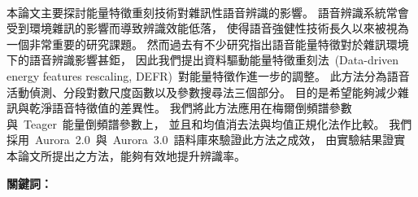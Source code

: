 \renewcommand{\thesisabstracthead}{摘要}
\renewcommand{\thesistitle}{\thesistitlechinese}
\begin{thesisabstract}
\\
本論文主要探討能量特徵重刻技術對雜訊性語音辨識的影響。
語音辨識系統常會受到環境雜訊的影響而導致辨識效能低落，
使得語音強健性技術長久以來被視為一個非常重要的研究課題。
然而過去有不少研究指出語音能量特徵對於雜訊環境下的語音辨識影響甚鉅，
因此我們提出資料驅動能量特徵重刻法~(Data-driven energy features rescaling, DEFR)~對能量特徵作進一步的調整。
此方法分為語音活動偵測、分段對數尺度函數以及參數搜尋法三個部分。
目的是希望能夠減少雜訊與乾淨語音特徵值的差異性。
我們將此方法應用在梅爾倒頻譜參數與~Teager~能量倒頻譜參數上，
並且和均值消去法與均值正規化法作比較。
我們採用~Aurora~2.0~與~Aurora~3.0~語料庫來驗證此方法之成效，
由實驗結果證實本論文所提出之方法，能夠有效地提升辨識率。

  \vspace{\baselineskip}
  \noindent
  \textbf{關鍵詞：} \Keywords
  \end{thesisabstract}

